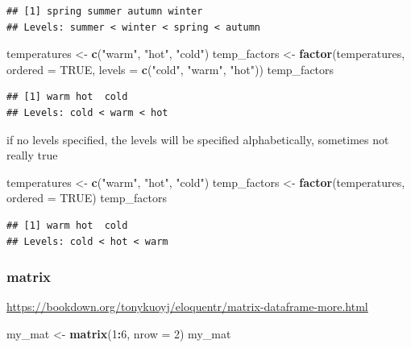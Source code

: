 \documentclass[
]{book}
\newenvironment{Shaded}{\begin{snugshade}}{\end{snugshade}}
\newcommand{\AttributeTok}[1]{\textcolor[rgb]{0.13,0.29,0.53}{#1}}
\newcommand{\ConstantTok}[1]{\textcolor[rgb]{0.56,0.35,0.01}{#1}}
\newcommand{\DecValTok}[1]{\textcolor[rgb]{0.00,0.00,0.81}{#1}}
\newcommand{\FunctionTok}[1]{\textcolor[rgb]{0.13,0.29,0.53}{\textbf{#1}}}
\newcommand{\NormalTok}[1]{#1}
\newcommand{\OtherTok}[1]{\textcolor[rgb]{0.56,0.35,0.01}{#1}}
\newcommand{\SpecialCharTok}[1]{\textcolor[rgb]{0.81,0.36,0.00}{\textbf{#1}}}
\newcommand{\StringTok}[1]{\textcolor[rgb]{0.31,0.60,0.02}{#1}}
\theoremstyle{definition}
\theoremstyle{definition}
\theoremstyle{definition}
\theoremstyle{definition}
\theoremstyle{remark}
\begin{document}
\begin{verbatim}
## [1] spring summer autumn winter
## Levels: summer < winter < spring < autumn
\end{verbatim}

\begin{Shaded}
\begin{Highlighting}[]
\NormalTok{temperatures }\OtherTok{\textless{}{-}} \FunctionTok{c}\NormalTok{(}\StringTok{"warm"}\NormalTok{, }\StringTok{"hot"}\NormalTok{, }\StringTok{"cold"}\NormalTok{)}
\NormalTok{temp\_factors }\OtherTok{\textless{}{-}} \FunctionTok{factor}\NormalTok{(temperatures, }\AttributeTok{ordered =} \ConstantTok{TRUE}\NormalTok{, }\AttributeTok{levels =} \FunctionTok{c}\NormalTok{(}\StringTok{"cold"}\NormalTok{, }\StringTok{"warm"}\NormalTok{, }\StringTok{"hot"}\NormalTok{))}
\NormalTok{temp\_factors}
\end{Highlighting}
\end{Shaded}

\begin{verbatim}
## [1] warm hot  cold
## Levels: cold < warm < hot
\end{verbatim}

if no levels specified, the levels will be specified alphabetically, sometimes not really true

\begin{Shaded}
\begin{Highlighting}[]
\NormalTok{temperatures }\OtherTok{\textless{}{-}} \FunctionTok{c}\NormalTok{(}\StringTok{"warm"}\NormalTok{, }\StringTok{"hot"}\NormalTok{, }\StringTok{"cold"}\NormalTok{)}
\NormalTok{temp\_factors }\OtherTok{\textless{}{-}} \FunctionTok{factor}\NormalTok{(temperatures, }\AttributeTok{ordered =} \ConstantTok{TRUE}\NormalTok{)}
\NormalTok{temp\_factors}
\end{Highlighting}
\end{Shaded}

\begin{verbatim}
## [1] warm hot  cold
## Levels: cold < hot < warm
\end{verbatim}

\subsubsection{matrix}\label{matrix}

\url{https://bookdown.org/tonykuoyj/eloquentr/matrix-dataframe-more.html}

\begin{Shaded}
\begin{Highlighting}[]
\NormalTok{my\_mat }\OtherTok{\textless{}{-}} \FunctionTok{matrix}\NormalTok{(}\DecValTok{1}\SpecialCharTok{:}\DecValTok{6}\NormalTok{, }\AttributeTok{nrow =} \DecValTok{2}\NormalTok{)}
\NormalTok{my\_mat}
\end{Highlighting}
\end{Shaded}
\end{document}
